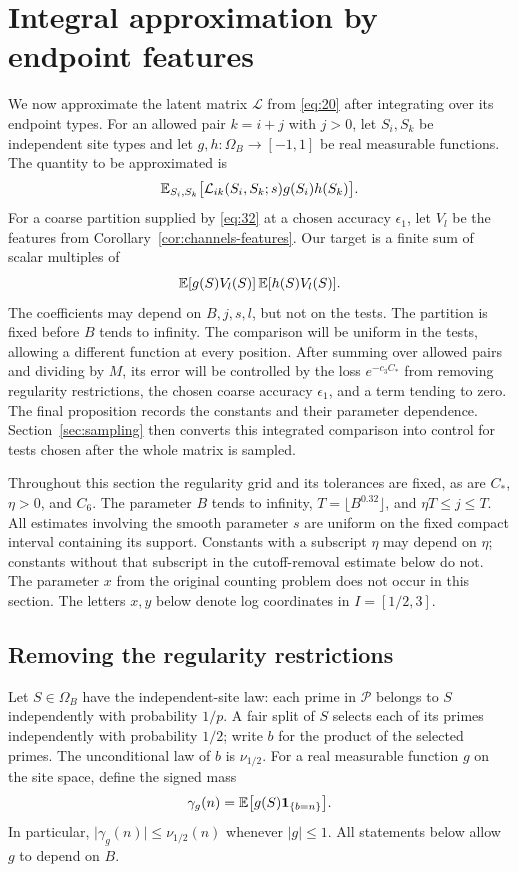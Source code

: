 \section{Integral approximation by endpoint features}\label{sec:kernel}

We now approximate the latent matrix \(\mathcal L\) from \eqref{eq:20}
after integrating over its endpoint types.  For an allowed pair
\(k=i+j\) with \(j>0\), let \(S_i,S_k\) be independent site types and
let \(g,h:\Omega_B\to[-1,1]\) be real measurable functions.  The
quantity to be approximated is
\[
 \mathbb E_{S_i,S_k}\big[
   \mathcal L_{ik}(S_i,S_k;s)g(S_i)h(S_k)\big].
\]
For a coarse partition supplied by \eqref{eq:32} at a chosen accuracy
\(\epsilon_1\), let \(V_l\) be the features from
Corollary~\ref{cor:channels-features}.  Our target is a finite sum of
scalar multiples of
\[
 \mathbb E[g(S)V_l(S)]\,\mathbb E[h(S)V_l(S)].
\]
The coefficients may depend on \(B,j,s,l\), but not on the tests.  The
partition is fixed before \(B\) tends to infinity.  The comparison will
be uniform in the tests, allowing a different function at every position.
After summing over allowed pairs and dividing by \(M\), its error will
be controlled by the loss \(e^{-c_3C_*}\) from removing regularity
restrictions, the chosen coarse accuracy \(\epsilon_1\), and a term
tending to zero.  The final proposition records the constants and their
parameter dependence.  Section~\ref{sec:sampling} then converts this integrated
comparison into control for tests chosen after the whole matrix is sampled.

Throughout this section the regularity grid and its tolerances are fixed,
as are \(C_*\), \(\eta>0\), and \(C_6\).
The parameter \(B\) tends to infinity, \(T=\lfloor B^{0.32}\rfloor\),
and \(\eta T\le j\le T\).  All estimates involving the smooth parameter
\(s\) are uniform on the fixed compact interval containing its support.
Constants with a subscript \(\eta\) may depend on \(\eta\); constants
without that subscript in the cutoff-removal estimate below do not.
The parameter \(x\) from the original counting problem does not occur
in this section.  The letters \(x,y\) below denote log coordinates in
\(I=[1/2,3]\).

\subsection{Removing the regularity restrictions}

Let \(S\in\Omega_B\) have the independent-site law: each prime in \(\mathcal P\)
belongs to \(S\) independently with probability \(1/p\).  A fair split
of \(S\) selects each of its primes independently with probability
\(1/2\); write \(b\) for the product of the selected primes.  The
unconditional law of \(b\) is \(\nu_{1/2}\).  For a real measurable
function \(g\) on the site space, define the signed mass
\[
 \gamma_g(n)=\mathbb E\big[g(S)\mathbf 1_{\{b=n\}}\big].
\]
In particular,
\(\lvert\gamma_g(n)\rvert\le\nu_{1/2}(n)\) whenever
\(\lvert g\rvert\le1\).  All statements below allow \(g\) to depend
on \(B\).

